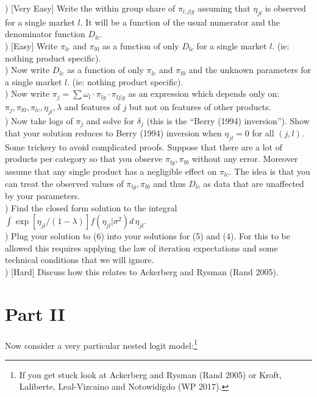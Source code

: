 \documentclass[12pt]{article}
\begin{document}
) [Very Easy] Write the within group share of $\pi_{l, j | g}$ assuming that $\eta_{jl}$ is observed for a single market $l$. It will be a function of the usual numerator and the denominator function $D_{lc}$.\\

) [Easy]  Write $\pi_{lc}$ and $\pi_{l0}$ as a function of only $D_{lc}$ for a single market $l$.  (ie: nothing product specific).\\

) Now write $D_{lc}$ as a function of only $\pi_{lc}$ and $\pi_{l0}$ and the unknown parameters for a single market $l$. (ie: nothing product specific).\\

) Now write $\pi_j = \sum \omega_l \cdot \pi_{lg} \cdot \pi_{lj|g}$ as an expression which depends only on: $\pi_j, \pi_{l0},\pi_{lc},\eta_{jl},\lambda$ and features of $j$ but not on features of other products.\\

) Now take logs of $\pi_j$ and solve for $\delta_j$ (this is the ``Berry (1994) inversion''). Show that your solution reduces to Berry (1994) inversion when $\eta_{jl} = 0$ for all $(j,l)$.\\

\noindent Some trickery to avoid complicated proofs. Suppose that there are a lot of products per category so that you observe $\pi_{lg}, \pi_{l0}$ without any error. Moreover assume that any single product has a negligible effect on $\pi_{lc}$. The idea is that you can treat the observed values of $\pi_{lg}, \pi_{l0}$ and thus $D_{lc}$ as data that are unaffected by your parameters.\\

) Find the closed form solution to the integral $\int \exp[\eta_{jl}/(1-\lambda)] f(\eta_{jl} | \sigma^2) d\, \eta_{jl}$.\\

) Plug your solution to (6) into your solutions for (5) and (4). For this to be allowed this requires applying the law of iteration expectations and some technical conditions that we will ignore. \\


) [Hard] Discuss how this relates to Ackerberg and Rysman (Rand 2005).


\section*{\normalsize Part II}
Now consider a very particular nested logit model:\footnote{If you get stuck look at Ackerberg and Rysman (Rand 2005) or Kroft, Laliberte, Leal-Vizcaino and Notowidigdo (WP 2017).}
\end{document}
